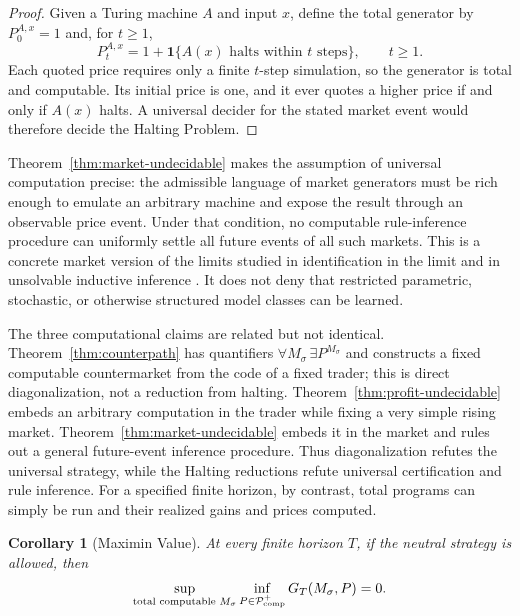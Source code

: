 \documentclass[aps,pra,reprint,superscriptaddress,amsmath,amssymb,floatfix]{revtex4-2}
\theoremstyle{plain}
\newtheorem{corollary}[theorem]{Corollary}
\theoremstyle{definition}
\theoremstyle{remark}
\begin{document}
\begin{proof}
Given a Turing machine \(A\) and input \(x\), define the total generator by
\(P_0^{A,x}=1\) and, for \(t\geq1\),
\begin{equation}
  P_t^{A,x}
  =1+\mathbf{1}\{A(x)\text{ halts within }t\text{ steps}\},
  \qquad t\geq1 .
  \label{eq:market-halting}
\end{equation}
Each quoted price requires only a finite \(t\)-step simulation, so the
generator is total and computable. Its initial price is one, and it ever quotes
a higher price if and only if \(A(x)\) halts. A universal decider for the stated
market event would therefore decide the Halting Problem.
\end{proof}

Theorem~\ref{thm:market-undecidable} makes the assumption of universal
computation precise: the admissible language of market generators must be rich
enough to emulate an arbitrary machine and expose the result through an
observable price event. Under that condition, no computable rule-inference
procedure can uniformly settle all future events of all such markets. This is
a concrete market version of the limits studied in identification in the limit
and in unsolvable inductive inference
\cite{go-67,blum75blum,angluin:83,ad-91,2016-AlexanderKarlSvozil-ml,moore}.
It does not deny that restricted parametric, stochastic, or otherwise
structured model classes can be learned.

The three computational claims are related but not identical.
Theorem~\ref{thm:counterpath} has quantifiers
\(\forall M_\sigma\,\exists P^{M_\sigma}\) and constructs a fixed computable
countermarket from the code of a fixed trader; this is direct diagonalization,
not a reduction from halting. Theorem~\ref{thm:profit-undecidable} embeds an
arbitrary computation in the trader while fixing a very simple rising market.
Theorem~\ref{thm:market-undecidable} embeds it in the market and rules out a
general future-event inference procedure. Thus diagonalization refutes the
universal strategy, while the Halting reductions refute universal
certification and rule inference. For a specified finite horizon, by contrast,
total programs can simply be run and their realized gains and prices computed.

\begin{corollary}[Maximin Value]
  \label{cor:maximin}
  At every finite horizon \(T\), if the neutral strategy is allowed, then
  \[
    \sup_{\text{\rm total computable }M_\sigma}
    \inf_{P\in\mathcal P_{\mathrm{comp}}^{+}}
    G_T(M_\sigma,P)=0.
  \]
\end{corollary}
\end{document}
